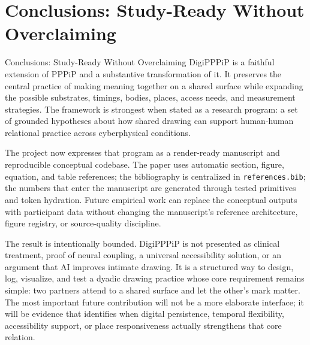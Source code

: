 \documentclass[
  ignorenonframetext,
]{beamer}
\author{\texorpdfstring{}{}}
\date{}
\begin{document}
\section{Conclusions: Study-Ready Without
Overclaiming}\label{sec:conclusions}

\begin{frame}{Conclusions: Study-Ready Without
Overclaiming}
DigiPPPiP is a faithful extension of PPPiP and a substantive
transformation of it. It preserves the central practice of making
meaning together on a shared surface while expanding the possible
substrates, timings, bodies, places, access needs, and measurement
strategies. The framework is strongest when stated as a research
program: a set of grounded hypotheses about how shared drawing can
support human-human relational practice across cyberphysical conditions.

The project now expresses that program as a render-ready manuscript and
reproducible conceptual codebase. The paper uses automatic section,
figure, equation, and table references; the bibliography is centralized
in \texttt{references.bib}; the numbers that enter the manuscript are
generated through tested primitives and token hydration. Future
empirical work can replace the conceptual outputs with participant data
without changing the manuscript's reference architecture, figure
registry, or source-quality discipline.

The result is intentionally bounded. DigiPPPiP is not presented as
clinical treatment, proof of neural coupling, a universal accessibility
solution, or an argument that AI improves intimate drawing. It is a
structured way to design, log, visualize, and test a dyadic drawing
practice whose core requirement remains simple: two partners attend to a
shared surface and let the other's mark matter. The most important
future contribution will not be a more elaborate interface; it will be
evidence that identifies when digital persistence, temporal flexibility,
accessibility support, or place responsiveness actually strengthens that
core relation.
\end{frame}
\end{document}
